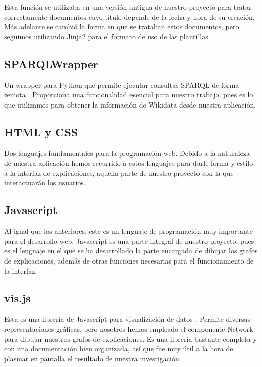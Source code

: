 Esta función se utilizaba en una versión antigua de nuestro proyecto para tratar correctamente documentos cuyo título depende de la fecha y hora de su creación. Más adelante se cambió la forma en que se trataban estos documentos, pero seguimos utilizando Jinja2 para el formato de uso de las plantillas.

\subsection*{SPARQLWrapper}

Un wrapper para Python que permite ejecutar consultas SPARQL de forma remota \cite{sparqlwrapper}. Proporciona una funcionalidad esencial para nuestro trabajo, pues es lo que utilizamos para obtener la información de Wikidata desde nuestra aplicación.

\subsection*{HTML y CSS}

Dos lenguajes fundamentales para la programación web. Debido a la naturaleza de nuestra aplicación hemos recurrido a estos lenguajes para darle forma y estilo a la interfaz de explicaciones, aquella parte de nuestro proyecto con la que interactuarán los usuarios.

\subsection*{Javascript}

Al igual que los anteriores, este es un lenguaje de programación muy importante para el desarrollo web. Javascript es una parte integral de nuestro proyecto, pues es el lenguaje en el que se ha desarrollado la parte encargada de dibujar los grafos de explicaciones, además de otras funciones necesarias para el funcionamiento de la interfaz.

\subsection*{vis.js}

Esta es una librería de Javascript para visualización de datos  \cite{visjs}. Permite diversas representaciones gráficas, pero nosotros hemos empleado el componente Network para dibujar nuestros grafos de explicaciones. Es una librería bastante completa y con una documentación bien organizada, así que fue muy útil a la hora de plasmar en pantalla el resultado de nuestra investigación.

